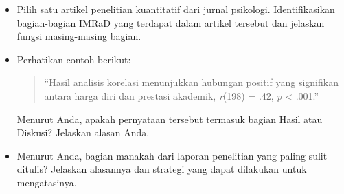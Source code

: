 \documentclass[
  indonesian,
  letterpaper,
  DIV=11,
  numbers=noendperiod]{scrreprt}
\begin{document}
\begin{tcolorbox}[enhanced jigsaw, colframe=quarto-callout-important-color-frame, toptitle=1mm, breakable, leftrule=.75mm, arc=.35mm, toprule=.15mm, colback=white, colbacktitle=quarto-callout-important-color!10!white, bottomtitle=1mm, bottomrule=.15mm, titlerule=0mm, title=\textcolor{quarto-callout-important-color}{\faExclamation}\hspace{0.5em}{Refleksi \& Diskusi}, coltitle=black, left=2mm, opacitybacktitle=0.6, opacityback=0, rightrule=.15mm]

\begin{itemize}
\item
  Pilih satu artikel penelitian kuantitatif dari jurnal psikologi.
  Identifikasikan bagian-bagian IMRaD yang terdapat dalam artikel
  tersebut dan jelaskan fungsi masing-masing bagian.
\item
  Perhatikan contoh berikut:

  \begin{quote}
  ``Hasil analisis korelasi menunjukkan hubungan positif yang signifikan
  antara harga diri dan prestasi akademik, \emph{r}(198) = .42, \emph{p}
  \textless{} .001.''
  \end{quote}

  Menurut Anda, apakah pernyataan tersebut termasuk bagian Hasil atau
  Diskusi? Jelaskan alasan Anda.
\item
  Menurut Anda, bagian manakah dari laporan penelitian yang paling sulit
  ditulis? Jelaskan alasannya dan strategi yang dapat dilakukan untuk
  mengatasinya.
\end{itemize}

\end{tcolorbox}
\end{document}
